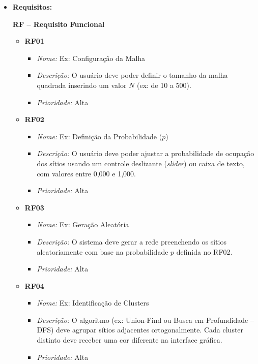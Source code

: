 \documentclass[12pt,a4paper]{article}
\begin{document}
\begin{itemize}[leftmargin=*]
\begin{itemize}
    \item \textbf{Requisitos:}

    \medskip
    \textbf{RF -- Requisito Funcional}

    \begin{itemize}
      \item \textbf{RF01}
      \begin{itemize}
        \item \textit{Nome:} Ex: Configuração da Malha
        \item \textit{Descrição:} O usuário deve poder definir o tamanho da malha quadrada inserindo um valor $N$ (ex: de 10 a 500).
        \item \textit{Prioridade:} Alta
      \end{itemize}

      \item \textbf{RF02}
      \begin{itemize}
        \item \textit{Nome:} Ex: Definição da Probabilidade ($p$)
        \item \textit{Descrição:} O usuário deve poder ajustar a probabilidade de ocupação dos sítios usando um controle deslizante (\textit{slider}) ou caixa de texto, com valores entre 0,000 e 1,000.
        \item \textit{Prioridade:} Alta
      \end{itemize}

      \item \textbf{RF03}
      \begin{itemize}
        \item \textit{Nome:} Ex: Geração Aleatória
        \item \textit{Descrição:} O sistema deve gerar a rede preenchendo os sítios aleatoriamente com base na probabilidade $p$ definida no RF02.
        \item \textit{Prioridade:} Alta
      \end{itemize}

      \item \textbf{RF04}
      \begin{itemize}
        \item \textit{Nome:} Ex: Identificação de Clusters
        \item \textit{Descrição:} O algoritmo (ex: Union-Find ou Busca em Profundidade -- DFS) deve agrupar sítios adjacentes ortogonalmente. Cada cluster distinto deve receber uma cor diferente na interface gráfica.
        \item \textit{Prioridade:} Alta
      \end{itemize}


\end{itemize}
\end{itemize}
\end{itemize}
\end{document}
